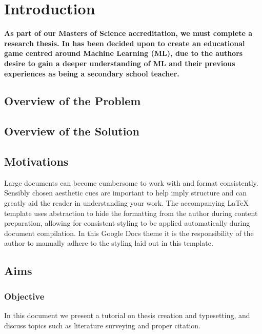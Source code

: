 \chapter{Introduction}
	\label{chap:intro}
	
	\textbf{As part of our Masters of Science accreditation, we must complete a research thesis. In has been decided upon to create an educational game centred around Machine Learning (ML), due to the authors desire to gain a deeper understanding of ML and their previous experiences as being a secondary school teacher.} %
	
	\section{Overview of the Problem}
		\label{sec:overview_of_problem}
	
	
	\section{Overview of the Solution}
		\label{sec:overview_of_solution}
		
	
	\section{Motivations}
	\label{sec:intro_motivation} 
	
	Large documents can become cumbersome to work with and format consistently. Sensibly chosen aesthetic cues are important to help imply structure and can greatly aid the reader in understanding your work. The accompanying LaTeX template uses abstraction to hide the formatting from the author during content preparation, allowing for consistent styling to be applied automatically during document compilation. In this Google Docs theme it is the responsibility of the author to manually adhere to the styling laid out in this template.
	
		
	\section{Aims}
		\label{sec:aims}
		
	
	
	
	\subsection{Objective}
		\label{sec:intro_objective} 
		
		In this document we present a tutorial on thesis creation and typesetting, and discuss topics such as literature surveying and proper citation. 
		
